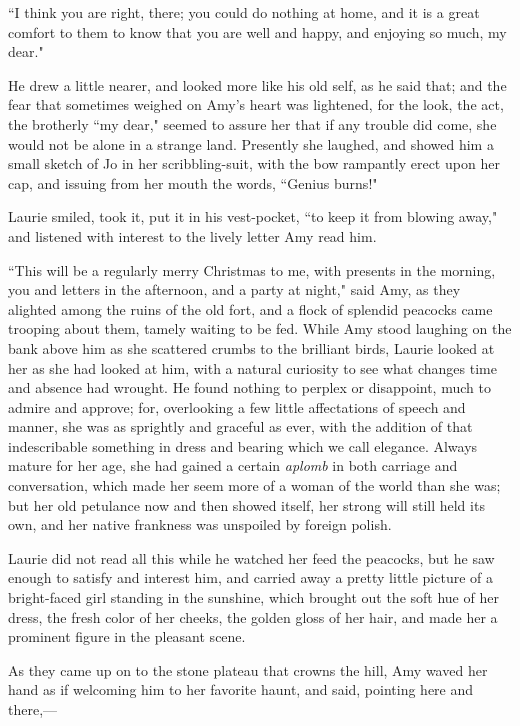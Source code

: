 ``I think you are right, there; you could do nothing at home, and it is a
great comfort to them to know that you are well and happy, and enjoying
so much, my dear."

He drew a little nearer, and looked more like his old self, as he said
that; and the fear that sometimes weighed on Amy's heart
was lightened, for the look, the act, the brotherly ``my dear," seemed to
assure her that if any trouble did come, she would not be alone in a
strange land. Presently she laughed, and showed him a small sketch of Jo
in her scribbling-suit, with the bow rampantly erect upon her cap, and
issuing from her mouth the words, ``Genius burns!"

Laurie smiled, took it, put it in his vest-pocket, ``to keep it from
blowing away," and listened with interest to the lively letter Amy read
him.

``This will be a regularly merry Christmas to me, with presents in the
morning, you and letters in the afternoon, and a party at night," said
Amy, as they alighted among the ruins of the old fort, and a flock of
splendid peacocks came trooping about them, tamely waiting to be fed.
While Amy stood laughing on the bank above him as she scattered crumbs
to the brilliant birds, Laurie looked at her as she had looked at him,
with a natural curiosity to see what changes time and absence had
wrought. He found nothing to perplex or disappoint, much to admire and
approve; for, overlooking a few little affectations of speech and
manner, she was as sprightly and graceful as ever, with the addition of
that indescribable something in dress and bearing which we call
elegance. Always mature for her age, she had gained a certain
\emph{aplomb} in both carriage and conversation, which made her seem
more of a woman of the world than she was; but her old petulance now and
then showed itself, her strong will still held its own, and her native
frankness was unspoiled by foreign polish.

Laurie did not read all this while he watched her feed the peacocks, but
he saw enough to satisfy and interest him, and carried away a pretty
little picture of a bright-faced girl standing in the sunshine, which
brought out the soft hue of her dress, the fresh color of her cheeks,
the golden gloss of her hair, and made her a prominent figure in the
pleasant scene.

As they came up on to the stone plateau that crowns the hill, Amy waved
her hand as if welcoming him to her favorite haunt, and said, pointing
here and there,---

